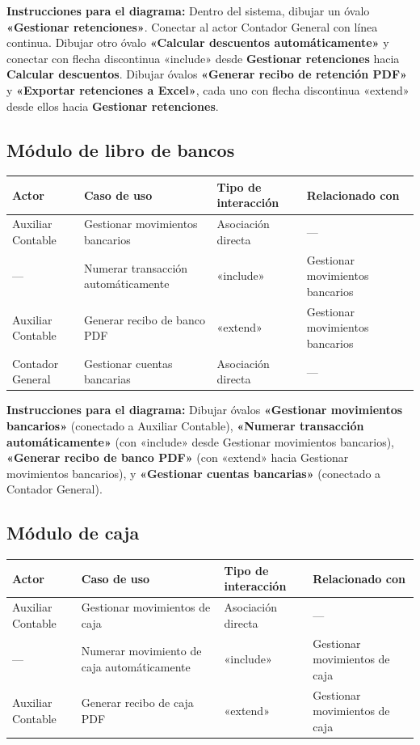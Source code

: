 \documentclass[stu]{apa7}
\begin{document}
\textbf{Instrucciones para el diagrama:}
Dentro del sistema, dibujar un óvalo \textbf{«Gestionar retenciones»}. Conectar al actor Contador General con línea continua. Dibujar otro óvalo \textbf{«Calcular descuentos automáticamente»} y conectar con flecha discontinua «include» desde \textbf{Gestionar retenciones} hacia \textbf{Calcular descuentos}. Dibujar óvalos \textbf{«Generar recibo de retención PDF»} y \textbf{«Exportar retenciones a Excel»}, cada uno con flecha discontinua «extend» desde ellos hacia \textbf{Gestionar retenciones}.

\subsection{Módulo de libro de bancos}

\begin{longtable}{|L{3cm}|L{5cm}|L{4cm}|L{3cm}|}
\hline
{}
\textbf{Actor} & \textbf{Caso de uso} & \textbf{Tipo de interacción} & \textbf{Relacionado con} \\
\hline
\endhead
Auxiliar Contable & Gestionar movimientos bancarios & Asociación directa & --- \\
\hline
--- & Numerar transacción automáticamente & «include» & Gestionar movimientos bancarios \\
\hline
Auxiliar Contable & Generar recibo de banco PDF & «extend» & Gestionar movimientos bancarios \\
\hline
Contador General & Gestionar cuentas bancarias & Asociación directa & --- \\
\hline
\end{longtable}

\textbf{Instrucciones para el diagrama:}
Dibujar óvalos \textbf{«Gestionar movimientos bancarios»} (conectado a Auxiliar Contable), \textbf{«Numerar transacción automáticamente»} (con «include» desde Gestionar movimientos bancarios), \textbf{«Generar recibo de banco PDF»} (con «extend» hacia Gestionar movimientos bancarios), y \textbf{«Gestionar cuentas bancarias»} (conectado a Contador General).

\subsection{Módulo de caja}

\begin{longtable}{|L{3cm}|L{5cm}|L{4cm}|L{3cm}|}
\hline
{}
\textbf{Actor} & \textbf{Caso de uso} & \textbf{Tipo de interacción} & \textbf{Relacionado con} \\
\hline
\endhead
Auxiliar Contable & Gestionar movimientos de caja & Asociación directa & --- \\
\hline
--- & Numerar movimiento de caja automáticamente & «include» & Gestionar movimientos de caja \\
\hline
Auxiliar Contable & Generar recibo de caja PDF & «extend» & Gestionar movimientos de caja \\
\hline
\end{longtable}
\end{document}
